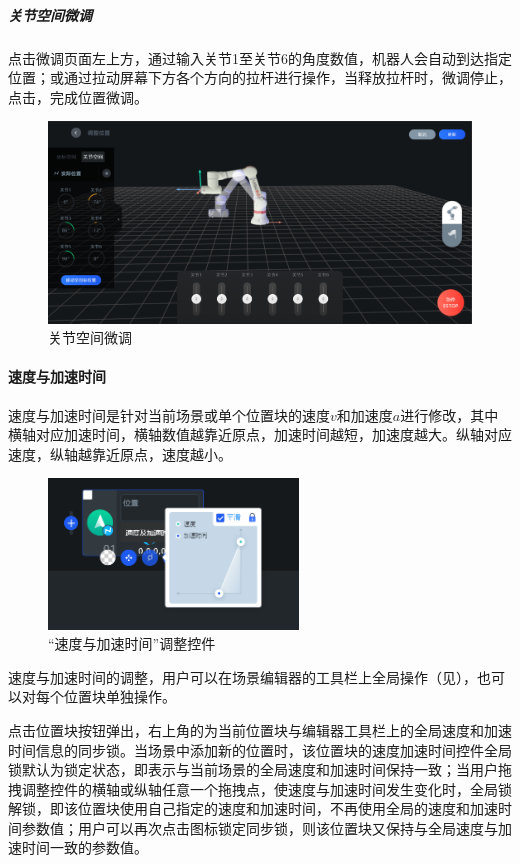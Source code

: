 \subparagraph{关节空间微调}
点击微调页面左上方，通过输入关节1至关节6的角度数值，机器人会自动到达指定位置；或通过拉动屏幕下方各个方向的拉杆进行操作，当释放拉杆时，微调停止，点击，完成位置微调。

\begin{figure}[ht]
	\centering
	\includegraphics[width=\textwidth]{shots/fine_tuning_joint.pdf}
	\caption{关节空间微调}
	\label{fig:关节空间微调}
\end{figure}

\paragraph{速度与加速时间}
速度与加速时间是针对当前场景或单个位置块的速度$v$和加速度$a$进行修改，其中横轴对应加速时间，横轴数值越靠近原点，加速时间越短，加速度越大。纵轴对应速度，纵轴越靠近原点，速度越小。

\begin{figure}[ht]
	\centering
	\includegraphics[height=4cm]{screen/3-11.png}
	\caption{“速度与加速时间”调整控件}
	\label{fig:速度与加速时间}
\end{figure}

速度与加速时间的调整，用户可以在场景编辑器的工具栏上全局操作（见），也可以对每个位置块单独操作。

点击位置块按钮弹出，右上角的为当前位置块与编辑器工具栏上的全局速度和加速时间信息的同步锁。当场景中添加新的位置时，该位置块的速度加速时间控件全局锁默认为锁定状态，即表示与当前场景的全局速度和加速时间保持一致；当用户拖拽调整控件的横轴或纵轴任意一个拖拽点，使速度与加速时间发生变化时，全局锁解锁，即该位置块使用自己指定的速度和加速时间，不再使用全局的速度和加速时间参数值；用户可以再次点击图标锁定同步锁，则该位置块又保持与全局速度与加速时间一致的参数值。

